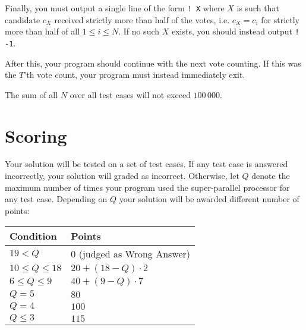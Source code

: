 Finally, you must output a single line of the form \texttt{! X} where $X$ is such that candidate $c_X$ received strictly more than half of the votes, i.e. $c_X = c_i$ for strictly more than half of all $1 \le i \le N$.
If no such $X$ exists, you should instead output \texttt{! -1}.

After this, your program should continue with the next vote counting.
If this was the $T$'th vote count, your program must instead immediately exit.

The sum of all $N$ over all test cases will not exceed $100\,000$.

\section*{Scoring}
Your solution will be tested on a set of test cases.
If any test case is answered incorrectly, your solution will graded as incorrect.
Otherwise, let $Q$ denote the maximum number of times your program used the super-parallel processor for any test case.
Depending on $Q$ your solution will be awarded different number of points:

\begin{center}
\begin{tabular}{|l|l|}
    \hline
    \textbf{Condition} & \textbf{Points} \\ \hline
    $19 < Q$ & $0$ (judged as Wrong Answer)\\ \hline
    $10 \le Q \le 18$ & $20 + (18 - Q) \cdot 2$ \\ \hline
    $6 \le Q \le 9$ & $40 + (9 - Q) \cdot 7$ \\ \hline
    $Q = 5$ & $80$ \\ \hline
    $Q = 4$ & $100$ \\ \hline
    $Q \le 3$ & $115$ \\ \hline
\end{tabular}
\end{center}
